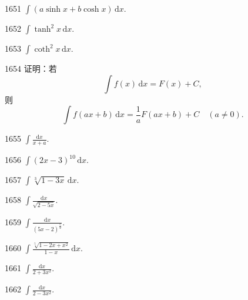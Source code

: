 \begin{prob}[S]{1651}
$\displaystyle\int (a\sinh x + b\cosh x) \,\mathrm{d}x.$
\end{prob}

\begin{prob}[S]{1652}
$\displaystyle\int \tanh^2 x \,\mathrm{d}x.$
\end{prob}

\begin{prob}[S]{1653}
$\displaystyle\int \coth^2 x \,\mathrm{d}x.$
\end{prob}

\begin{prob}[M]{1654}
证明：若
\[
\int f(x)\,\mathrm{d}x = F(x) + C,
\]
则
\[
\int f(ax + b)\,\mathrm{d}x = \frac{1}{a}F(ax + b) + C \quad (a \neq 0).
\]
\end{prob}


\begin{prob}[S]{1655}
$\displaystyle\int \frac{\mathrm{d}x}{x + a}.$
\end{prob}

\begin{prob}[S]{1656}
$\displaystyle\int (2x - 3)^{10} \,\mathrm{d}x.$
\end{prob}

\begin{prob}[S]{1657}
$\displaystyle\int \sqrt[3]{1 - 3x} \,\mathrm{d}x.$
\end{prob}

\begin{prob}[S]{1658}
$\displaystyle\int \frac{\mathrm{d}x}{\sqrt{2 - 5x}}.$
\end{prob}

\begin{prob}[S]{1659}
$\displaystyle\int \frac{\mathrm{d}x}{(5x - 2)^{\frac{5}{2}}}.$
\end{prob}

\begin{prob}[S]{1660}
$\displaystyle\int \frac{\sqrt[5]{1 - 2x + x^2}}{1 - x} \,\mathrm{d}x.$
\end{prob}

\begin{prob}[S]{1661}
$\displaystyle\int \frac{\mathrm{d}x}{2 + 3x^2}.$
\end{prob}

\begin{prob}[S]{1662}
$\displaystyle\int \frac{\mathrm{d}x}{2 - 3x^2}.$
\end{prob}

